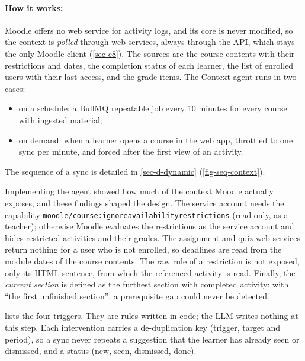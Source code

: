 \paragraph{How it works:} Moodle offers no web service for activity logs,
and its core is never modified, so the context is \emph{polled} through
web services, always through the API, which stays the only Moodle client
(\cref{sec-c8}). The sources are the course contents with their
restrictions and dates, the completion status of each learner, the list
of enrolled users with their last access, and the grade items. The
Context agent runs in two cases:
\begin{itemize}
  \item on a schedule: a BullMQ repeatable job every 10 minutes for every
        course with ingested material;
  \item on demand: when a learner opens a course in the web app,
        throttled to one sync per minute, and forced after the first view
        of an activity.
\end{itemize}
The sequence of a sync is detailed in \cref{sec-d-dynamic}
(\cref{fig-seq-context}).

Implementing the agent showed how much of the context Moodle actually
exposes, and these findings shaped the design. The service account needs
the capability \texttt{moodle/course:ignoreavailabilityrestrictions}
(read-only, as a teacher); otherwise Moodle evaluates the restrictions as
the service account and hides restricted activities and their grades.
The assignment and quiz web services return nothing for a user who is not
enrolled, so deadlines are read from the module dates of the course
contents. The raw rule of a restriction is not exposed, only its HTML
sentence, from which the referenced activity is read. Finally, the
\emph{current section} is defined as the furthest section with completed
activity: with ``the first unfinished section'', a prerequisite gap could
never be detected.

 lists the four triggers. They are rules written in
code; the LLM writes nothing at this step. Each intervention carries a
de-duplication key (trigger, target and period), so a sync never repeats
a suggestion that the learner has already seen or dismissed, and a status
(new, seen, dismissed, done).

